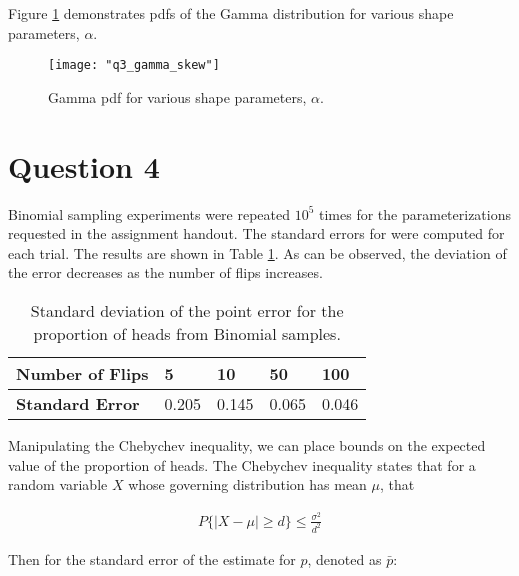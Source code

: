 \documentclass{article}[12 pt]
\begin{document}
Figure \ref{fig:q3_gamma_skew} demonstrates pdfs of the Gamma distribution for various shape parameters, $\alpha$.
\begin{center}
	\begin{figure}[H]
		\centering
		\texttt{[image: "q3\_gamma\_skew"]}
		\caption{Gamma pdf for various shape parameters, $\alpha$. }
		\label{fig:q3_gamma_skew}
	\end{figure}
\end{center}


\section*{Question 4}
Binomial sampling experiments were repeated $10^5$ times for the parameterizations requested in the assignment handout.  The standard errors for were computed for each trial.  The results are shown in Table \ref{tab:q4_standard_error}.  As can be observed, the deviation of the error decreases as the number of flips increases.

\begin{table}[H]
	\caption{Standard deviation of the point error for the proportion of heads from Binomial samples.}
	\label{tab:q4_standard_error}
	\begin{center}
		\begin{tabularx}{\textwidth}{ |X|X|X|X|X| } 
			\hline
			\textbf{Number of Flips} & 5 & 10 & 50 & 100\\
			\hline
			\textbf{Standard Error} & 0.205 & 0.145 & 0.065 & 0.046 \\
			\hline
		\end{tabularx}
	\end{center}
\end{table}


\noindent
Manipulating the Chebychev inequality, we can place bounds on the expected value of the proportion of heads.  The Chebychev inequality states that for a random variable $X$ whose governing distribution has mean $\mu$, that

\begin{align*}
	P\{|X-\mu| \geq d\} \leq \frac{\sigma^2}{d^2}
\end{align*}

\noindent
Then for the standard error of the estimate for $p$, denoted as $\bar{p}$:
\end{document}
